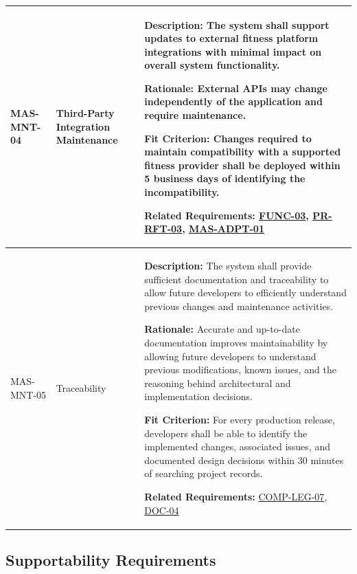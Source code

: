 \documentclass[12pt]{article}
\begin{document}
\begin{xltabular}{\textwidth}{|p{2.6cm}|p{3.4cm}|X|}
MAS-MNT-04\hypertarget{req:MAS-MNT-04}{} &
Third-Party Integration Maintenance &
\textbf{Description:} The system shall support updates to external fitness platform integrations with minimal impact on overall system functionality.

\textbf{Rationale:} External APIs may change independently of the application and require maintenance.

\textbf{Fit Criterion:} Changes required to maintain compatibility with a supported fitness provider shall be deployed within 5 business days of identifying the incompatibility.

\textbf{Related Requirements:} \hyperlink{req:FUNC-03}{FUNC-03}, \hyperlink{req:PR-RFT-03}{PR-RFT-03}, \hyperlink{req:MAS-ADPT-01}{MAS-ADPT-01}\\
\hline

MAS-MNT-05\hypertarget{req:MAS-MNT-05}{} &
Traceability &
\textbf{Description:} The system shall provide sufficient documentation and traceability to allow future developers to efficiently understand previous changes and maintenance activities.

\textbf{Rationale:} Accurate and up-to-date documentation improves maintainability by allowing future developers to understand previous modifications, known issues, and the reasoning behind architectural and implementation decisions.

\textbf{Fit Criterion:} For every production release, developers shall be able to identify the implemented changes, associated issues, and documented design decisions within 30 minutes of searching project records.

\textbf{Related Requirements:} \hyperlink{req:COMP-LEG-07}{COMP-LEG-07}, \hyperlink{req:DOC-04}{DOC-04}\\
\hline

\end{xltabular}

\subsection{Supportability Requirements}
\end{document}

